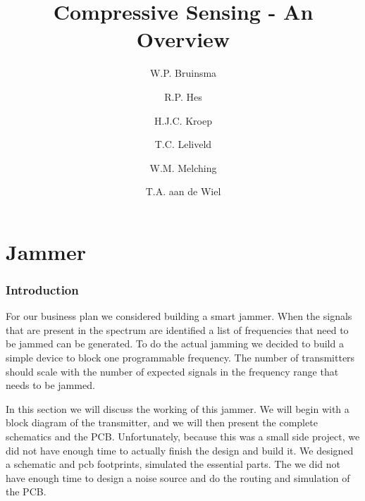 \documentclass[a4paper, openany, oneside]{memoir}
\title{Compressive Sensing - An Overview}
\author{W.P. Bruinsma \and R.P. Hes \and H.J.C. Kroep \and T.C. Leliveld \and W.M. Melching \and T.A. aan de Wiel}
\begin{document}
\chapter{Jammer}
\label{cha:jammer}

\subsection{Introduction}
For our business plan we considered building a smart jammer. When the signals that are present in the spectrum are identified a list of frequencies that need to be jammed can be generated. To do the actual jamming we decided to build a simple device to block one programmable frequency. The number of transmitters should scale with the number of expected signals in the frequency range that needs to be jammed.

In this section we will discuss the working of this jammer. We will begin with a block diagram of the transmitter, and we will then present the complete schematics and the PCB\@. Unfortunately, because this was a small side project, we did not have enough time to actually finish the design and build it. We designed a schematic and pcb footprints, simulated the essential parts. The we did not have enough time to design a noise source and do the routing and simulation of the PCB\@.
\end{document}
